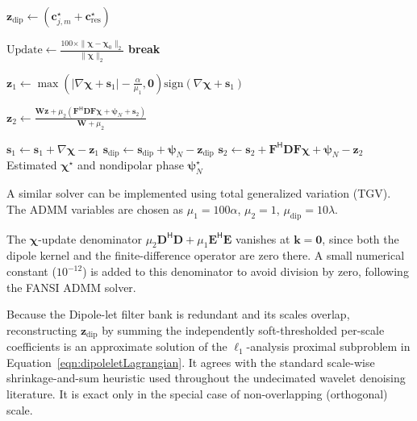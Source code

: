\documentclass{article}
\begin{document}
\begin{algorithm}[htbp]
\begin{algorithmic}[1]
    \State $\mathbf{z}_{\text{dip}} \gets \left(\mathbf{c}_{j,m}^{\star}+ \mathbf{c}_{\text{res}}^{\star}\right)$  %

    \State $\text{Update} \gets \frac{100 \times \| \bm{\chi} - \bm{\chi}_{0} \|_2}{\| \bm{\chi} \|_2}$
        \State \textbf{break} %
    \EndIf

    \State $\mathbf{z}_1 \gets \max\left(|\nabla \bm{\chi} + \mathbf{s}_1| - \frac{\alpha}{\mu_1}, \mathbf{0}\right) \text{sign}(\nabla \bm{\chi} + \mathbf{s}_1)$

    \State $\mathbf{z}_{2} \gets \frac{\mathbf{W} \mathbf{z} + \mu_2 (\mathbf{F}^\mathsf{H} \mathbf{D} \mathbf{F} \bm{\chi} + \bm{\psi}_{N} + \mathbf{s}_{2})}{\mathbf{W} + \mu_2}$

    \State $\mathbf{s}_1 \gets \mathbf{s}_1 + \nabla \bm{\chi} - \mathbf{z}_1$
    \State $\mathbf{s}_{\text{dip}} \gets \mathbf{s}_{\text{dip}} + \bm{\psi}_{N} - \mathbf{z}_{\text{dip}}$
    \State $\mathbf{s}_{2} \gets \mathbf{s}_{2} + \mathbf{F}^\mathsf{H} \mathbf{D} \mathbf{F} \bm{\chi} + \bm{\psi}_{N} - \mathbf{z}_{2}$
\EndFor
\Ensure Estimated $\bm{\chi}^{\star}$ and nondipolar phase $\bm{\psi}_{N}^{\star}$
\end{algorithmic}
\end{algorithm}
A similar solver can be implemented using total generalized variation (TGV)\cite{bredies2013tgv}. The ADMM variables are chosen as $\mu_{1}=100\alpha$, $\mu_{2}=1$, $\mu_{\text{dip}}=10\lambda$.

The $\bm{\chi}$-update denominator $\mu_2 \mathbf{D}^{\mathsf{H}}\mathbf{D} + \mu_1 \mathbf{E}^{\mathsf{H}}\mathbf{E}$ vanishes at $\mathbf{k}=\mathbf{0}$, since both the dipole kernel and the finite-difference operator are zero there. A small numerical constant ($10^{-12}$) is added to this denominator to avoid division by zero, following the FANSI ADMM solver.

Because the Dipole-let filter bank is redundant and its scales overlap, reconstructing $\mathbf{z}_{\text{dip}}$ by summing the independently soft-thresholded per-scale coefficients is an approximate solution of the $\ell_1$-analysis proximal subproblem in Equation~\ref{eqn:dipoleletLagrangian}. It agrees with the standard scale-wise shrinkage-and-sum heuristic used throughout the undecimated wavelet denoising literature. It is exact only in the special case of non-overlapping (orthogonal) scale.
\end{document}
